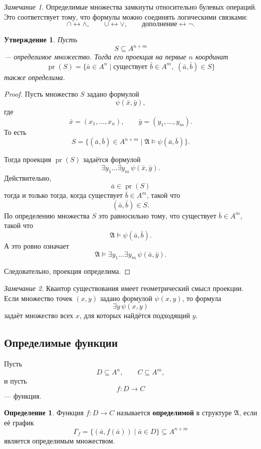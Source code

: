 \documentclass[12pt,a4paper,oneside,openany]{book}
\theoremstyle{definition}
\newtheorem{definition}{Определение}[chapter]
\theoremstyle{plain}
\newtheorem{proposition}{Утверждение}[chapter]
\theoremstyle{remark}
\newtheorem{remark}{Замечание}[chapter]
\begin{document}
\begin{remark}
Определимые множества замкнуты относительно булевых операций. Это соответствует тому, что формулы можно соединять логическими связками:
\[
\cap \longleftrightarrow \wedge,
\qquad
\cup \longleftrightarrow \vee,
\qquad
\text{дополнение} \longleftrightarrow \neg.
\]
\end{remark}

\begin{proposition}
Пусть
\[
S\subseteq A^{n+m}
\]
— определимое множество. Тогда его проекция на первые $n$ координат
\[
\operatorname{pr}(S)
=
\{\bar a\in A^n\mid \text{существует } \bar b\in A^m,\;(\bar a,\bar b)\in S\}
\]
также определима.
\end{proposition}

\begin{proof}
Пусть множество $S$ задано формулой
\[
\psi(\bar x,\bar y),
\]
где
\[
\bar x=(x_1,\ldots,x_n),
\qquad
\bar y=(y_1,\ldots,y_m).
\]
То есть
\[
S=
\{(\bar a,\bar b)\in A^{n+m}\mid
\mathfrak A\models\psi(\bar a,\bar b)\}.
\]

Тогда проекция $\operatorname{pr}(S)$ задаётся формулой
\[
\exists y_1\ldots \exists y_m\,\psi(\bar x,\bar y).
\]
Действительно,
\[
\bar a\in\operatorname{pr}(S)
\]
тогда и только тогда, когда существует $\bar b\in A^m$, такой что
\[
(\bar a,\bar b)\in S.
\]
По определению множества $S$ это равносильно тому, что существует $\bar b\in A^m$, такой что
\[
\mathfrak A\models\psi(\bar a,\bar b).
\]
А это ровно означает
\[
\mathfrak A\models\exists y_1\ldots \exists y_m\,\psi(\bar a,\bar y).
\]

Следовательно, проекция определима.
\end{proof}

\begin{remark}
Квантор существования имеет геометрический смысл проекции. Если множество точек $(x,y)$ задано формулой $\psi(x,y)$, то формула
\[
\exists y\,\psi(x,y)
\]
задаёт множество всех $x$, для которых найдётся подходящий $y$.
\end{remark}

\subsection{Определимые функции}

Пусть
\[
D\subseteq A^n,
\qquad
C\subseteq A^m,
\]
и пусть
\[
f:D\to C
\]
— функция.

\begin{definition}
Функция $f:D\to C$ называется \textbf{определимой} в структуре $\mathfrak A$, если её график
\[
\Gamma_f=
\{(\bar a,f(\bar a))\mid \bar a\in D\}
\subseteq A^{n+m}
\]
является определимым множеством.
\end{definition}
\end{document}
